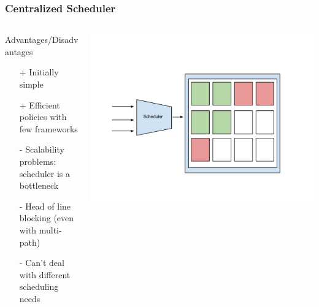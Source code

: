 \documentclass[notes]{beamer}
\begin{document}
  \note{}

  \begin{frame}
    \frametitle{Centralized Scheduler}
    \begin{columns}[T]
       \begin{column}{.5\textwidth}
        \begin{block}{Advantages/Disadvantages}
            \begin{itemize}
              \item[+] Initially simple
              \item[+] Efficient policies with few frameworks
              \item[-] Scalability problems: scheduler is a bottleneck
              \item[-] Head of line blocking (even with multi-path)
              \item[-] Can't deal with different scheduling needs
            \end{itemize}
        \end{block}
       \end{column}
       \begin{column}{.6\textwidth}
         \includegraphics[trim = 0mm 0mm 50mm 0mm,clip,scale=0.20,natwidth=960,natheight=720]{CentralizedScheduler.png}
       \end{column}
     \end{columns}
  \end{frame}

  \note{}
\end{document}
